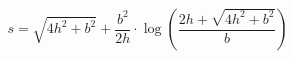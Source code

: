 \documentclass[12pt]{article}
\begin{document}
\begin{displaymath}
s = \sqrt {4h^2 + b^2} + \frac {b^2} {2h} \cdot \log \left( \frac {2h + \sqrt {4h^2 + b^2} } {b} \right)
\end{displaymath}
\end{document}
